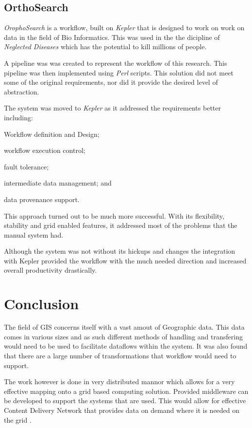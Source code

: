 \documentclass[11pt,twocolumn]{article}
\begin{document}
    \subsection*{OrthoSearch}
      \emph{OrophoSearch} is a workflow,
      built on \emph{Kepler} that is designed to work on
      work on data in the field of Bio Informatics. This
      was used in the the dicipline of \emph{Neglected Diseases}
      which has the potential to kill millions of people.

      A pipeline was was created to represent the workflow
      of this research. This pipeline was then implemented
      using \emph{Perl} scripts. This solution did not meet
      some of the original requirements, nor did it provide
      the desired level of abstraction.

      The system was moved to \emph{Kepler} as it addressed
      the requirements better including: \begin{inparaenum}[(i)]
      \item Workflow definition and Design; \item workflow execution
      control; \item fault tolerance; \item intermediate data management;
      and \item data provenance support. \end{inparaenum}

      This approach turned out to be much more successful. With
      its flexibility, stability and grid enabled features, it
      addressed most of the problems that the manual system had.

      Although the system was not without its hickups and changes
      the integration with Kepler provided the workflow with the
      much needed direction and increased overall productivity
      drastically.\cite{daCruz:2008:OSW:1363686.1363983}


\section{Conclusion}
   The field of GIS concerns itself with a vast amout of Geographic
   data. This data comes in various sizes and as such different
   methods of handling and transfering would need to be used to
   facilitate dataflows within the system. It was also found that
   there are a large number of transformations that workflow would
   need to support.

   The work however is done in very distributed mannor which allows
   for a very effective mapping onto a grid based computing solution.
   Provided middleware can be developed to support the systems that
   are used. This would allow for effective Content Delivery Network
   that provides data on demand where it is needed on the grid
   \cite{Montella:2007:UGC:1272980.1272995}.
\end{document}
